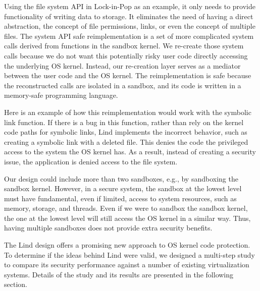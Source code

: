 Using the file system API in Lock-in-Pop as an example, it only needs
to provide functionality of writing data to storage.
It eliminates the need of having a direct abstraction, the
concept of file permissions, links, or even the concept of multiple files.
The system API safe reimplementation is a set of more complicated system calls
derived from functions in the sandbox kernel.
We re-create those system calls because we do not want this potentially risky user code
directly accessing the underlying OS kernel.
Instead, our re-creation layer serves as a mediator between the user code
and the OS kernel. The reimplementation is safe
because the reconstructed calls are isolated in a sandbox, and its code is written
 in a memory-safe programming language.

Here is an example of how this reimplementation would work with the symbolic link function.
If there is a bug in this function, rather than rely on the kernel code paths
for symbolic links, Lind implements the incorrect behavior, such as creating a symbolic link
with a deleted file.
This denies the code the privileged access to the system the OS kernel has.
As a result, instead of creating a security issue, the application is denied access
to the file system.

Our design could include more than two sandboxes, e.g., by sandboxing the sandbox
kernel. However, in a secure system,
the sandbox at the lowest level must have fundamental,
even if limited, access to system resources, such as memory, storage, and threads.
Even if we were to sandbox the sandbox kernel,
the one at the lowest level will still access the OS kernel in a similar way.
Thus, having multiple sandboxes does not provide extra security benefits.

The Lind design offers a promising new approach to OS kernel code protection.
 To determine if the ideas behind Lind were valid, we
designed a multi-step study to compare its security performance against a number
 of existing virtualization systems. Details of the study and its results are presented
 in the following section.
